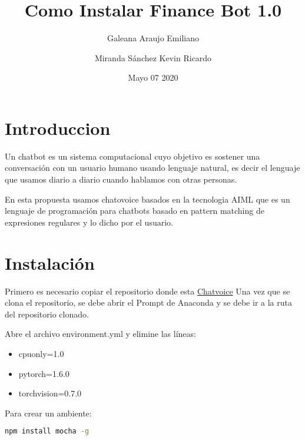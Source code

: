 \documentclass{article}
\title{\huge Como Instalar Finance Bot 1.0}
\author{Galeana Araujo Emiliano \and Miranda Sánchez Kevin Ricardo}
\date{Mayo 07 2020}
\begin{document}
\maketitle

\newpage

\section{Introduccion}

\justifying
Un chatbot es un sistema computacional cuyo objetivo es sostener una conversación con un usuario humano usando lenguaje natural, es decir el lenguaje que usamos diario a diario cuando hablamos con otras personas.\par

En esta propuesta usamos chatovoice basados en la tecnologia AIML que es un lenguaje de programación para chatbots basado en pattern matching de expresiones regulares y lo dicho por el usuario.

\newpage
\section{Instalación}
Primero es necesario copiar el repositorio donde esta \href{https://github.com/ivanvladimir/chatvoice}{Chatvoice}
Una vez que se clona el repositorio, se debe abrir el Prompt de Anaconda y se debe ir a la ruta del repositorio clonado.\par

Abre el archivo environment.yml y elimine las líneas:
\begin{itemize}
\item cpuonly=1.0
\item pytorch=1.6.0
\item torchvision=0.7.0
\end{itemize}

Para crear un ambiente:

\begin{lstlisting}[frame=single,language=bash,caption=etiqueta]
  npm install mocha -g
\end{lstlisting}


\end{document}
